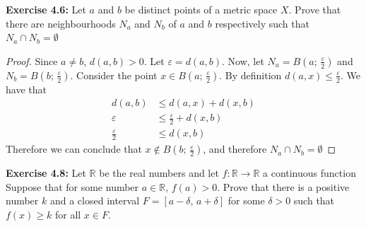 \documentclass{article}
\begin{document}
\textbf{Exercise 4.6:} Let $a$ and $b$ be distinct points of a metric space $X$. Prove that there are neighbourhoods $N_a$ and $N_b$
of $a$ and $b$ respectively such that $N_a \cap N_b = \emptyset$

\begin{proof}
    Since $a \ne b$, $d(a, b) > 0$. Let $\varepsilon = d(a, b)$. Now, let $N_a = B(a;\,\frac{\varepsilon}{2})$ and 
    $N_b = B(b;\,\frac{\varepsilon}{2})$. Consider the point $x \in B(a;\,\frac{\varepsilon}{2})$. By definition
    $d(a, x) \le \frac{\varepsilon}{2}$. We have that
    \begin{align*}
        d(a, b) &\le d(a, x) + d(x, b)\\
        \varepsilon &\le \frac{\varepsilon}{2} + d(x, b)\\
        \frac{\varepsilon}{2} &\le d(x, b)
    \end{align*}
    Therefore we can conclude that $x \notin B(b;\,\frac{\varepsilon}{2})$, and therefore $N_a \cap N_b = \emptyset$
\end{proof}

\textbf{Exercise 4.8:} Let $\mathbb{R}$ be the real numbers and let $f: \mathbb{R} \to \mathbb{R}$ a continuous function
Suppose that for some number $a \in \mathbb{R},\,f(a) > 0$. Prove that there is a positive number $k$ and a closed interval
$F = [a - \delta,\,a + \delta]$ for some $\delta > 0$ such that $f(x) \ge k$ for all $x \in F$.
\end{document}

